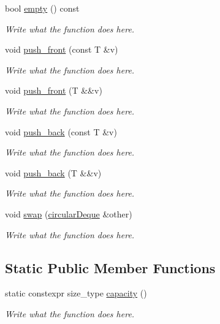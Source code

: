 \begin{DoxyCompactItemize}
bool \hyperlink{classcircularDeque_a2432b34cbd305c8ec71438e136da7214}{empty} () const 
\begin{DoxyCompactList}\small\item\em Write what the function does here. \end{DoxyCompactList}\item 
void \hyperlink{classcircularDeque_a5de1e2619685438d18988bfe5e6e4ff7}{push\+\_\+front} (const T \&v)
\begin{DoxyCompactList}\small\item\em Write what the function does here. \end{DoxyCompactList}\item 
void \hyperlink{classcircularDeque_aaf0d6018afb495e3e10b1902412ce34e}{push\+\_\+front} (T \&\&v)
\begin{DoxyCompactList}\small\item\em Write what the function does here. \end{DoxyCompactList}\item 
void \hyperlink{classcircularDeque_a8a532683eccb1236b6d9aebedafd1273}{push\+\_\+back} (const T \&v)
\begin{DoxyCompactList}\small\item\em Write what the function does here. \end{DoxyCompactList}\item 
void \hyperlink{classcircularDeque_a969210491beb98fea7b64fe4ea58c5e4}{push\+\_\+back} (T \&\&v)
\begin{DoxyCompactList}\small\item\em Write what the function does here. \end{DoxyCompactList}\item 
void \hyperlink{classcircularDeque_a3c5d2c844e923a7d9e06f4ee44ed545d}{swap} (\hyperlink{classcircularDeque}{circular\+Deque} \&other)
\begin{DoxyCompactList}\small\item\em Write what the function does here. \end{DoxyCompactList}\end{DoxyCompactItemize}
\subsection*{Static Public Member Functions}
\begin{DoxyCompactItemize}
\item 
static constexpr size\+\_\+type \hyperlink{classcircularDeque_aa40ac025e9668879d8c8e07fcce79f48}{capacity} ()
\begin{DoxyCompactList}\small\item\em Write what the function does here. \end{DoxyCompactList}\end{DoxyCompactItemize}
